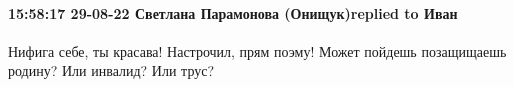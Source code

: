  
 
 
 
 

\paragraph{15:58:17 29-08-22 Светлана Парамонова (Онищук)replied to Иван}

Нифига себе, ты красава! Настрочил, прям поэму! Может пойдешь позащищаешь
родину? Или инвалид? Или трус?


